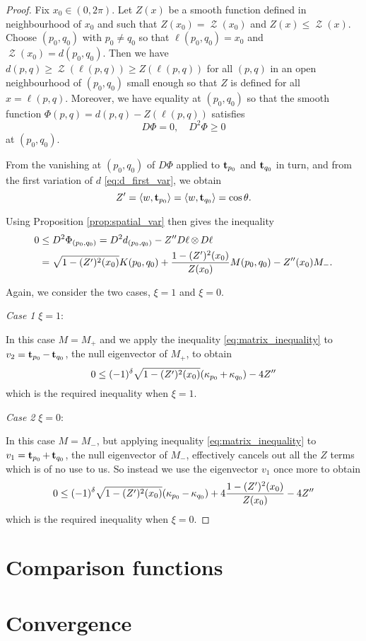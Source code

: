 \documentclass[11pt]{amsart}
\DeclareMathOperator{\chordarcprofile}{\mathcal{Z}}
\begin{document}
\begin{proof}
Fix $x_0 \in (0,2\pi)$. Let $Z(x)$ be a smooth function defined in neighbourhood of $x_0$ and such that $Z(x_0) = \chordarcprofile(x_0)$ and $Z(x) \leq \chordarcprofile(x)$. Choose $(p_0,q_0)$ with $p_0\ne q_0$ so that $\ell(p_0, q_0) = x_0$ and $\chordarcprofile(x_0) = d(p_0, q_0)$.  Then we have $d(p, q) \geq \chordarcprofile(\ell(p, q)) \geq Z(\ell(p, q))$ for all $(p,q)$ in an open neighbourhood of $(p_0,q_0)$ small enough so that $Z$ is defined for all $x=\ell(p,q)$. Moreover, we have equality at $(p_0, q_0)$ so that the smooth function $\Phi(p, q) = d(p,q) - Z(\ell(p, q))$ satisfies
\[
D \Phi = 0, \quad D^2\Phi \geq 0
\]
at $(p_0, q_0)$.

From the vanishing at $(p_0,q_0)$ of $D\Phi$ applied to $\operatorname{\mathbf{t}}_{p_0}$ and $\operatorname{\mathbf{t}}_{q_0}$ in turn, and from the first variation of $d$ \eqref{eq:d_first_var}, we obtain
\begin{equation}
\label{eq:vanishing_first_var}
Z' = \langle{w},{\operatorname{\mathbf{t}}_{p_0}}\rangle = \langle{w},{\operatorname{\mathbf{t}}_{q_0}}\rangle = \cos\theta.
\end{equation}

Using Proposition \ref{prop:spatial_var} then gives the inequality
\begin{equation}
\label{eq:matrix_inequality}
\begin{split}
0 &\leq D^2\Phi_{(p_0,q_0)} = D^2 d_{(p_0,q_0)} - Z'' D\ell\operatorname{\otimes} D\ell \\
&= \sqrt{1 - (Z')^2(x_0)} K(p_0,q_0) + \frac{1-(Z')^2(x_0)}{Z(x_0)} M (p_0,q_0) - Z''(x_0) M_-.
\end{split}
\end{equation}

Again, we consider the two cases, $\xi=1$ and $\xi=0$.

\emph{Case 1} $\xi=1$:

In this case $M=M_+$ and we apply the inequality \eqref{eq:matrix_inequality} to $v_2 = \operatorname{\mathbf{t}}_{p_0} - \operatorname{\mathbf{t}}_{q_0}$, the null eigenvector of $M_+$, to obtain
\[
0 \leq (-1)^{\delta} \sqrt{1 - (Z')^2(x_0)} (\operatorname{\kappa}_{p_0} + \operatorname{\kappa}_{q_0}) - 4Z''
\]
which is the required inequality when $\xi=1$.

\emph{Case 2} $\xi=0$:

In this case $M=M_-$, but applying inequality \eqref{eq:matrix_inequality} to $v_1 = \operatorname{\mathbf{t}}_{p_0} + \operatorname{\mathbf{t}}_{q_0}$, the null eigenvector of $M_-$, effectively cancels out all the $Z$ terms which is of no use to us. So instead we use the eigenvector $v_1$ once more to obtain
\[
0 \leq (-1)^{\delta} \sqrt{1 - (Z')^2(x_0)} (\operatorname{\kappa}_{p_0} - \operatorname{\kappa}_{q_0}) + 4\frac{1-(Z')^2(x_0)}{Z(x_0)} -4Z''
\]
which is the required inequality when $\xi=0$.
\end{proof}

\section{Comparison functions}
\label{sec:orgheadline11}
\section{Convergence}
\label{sec:orgheadline12}
\end{document}

